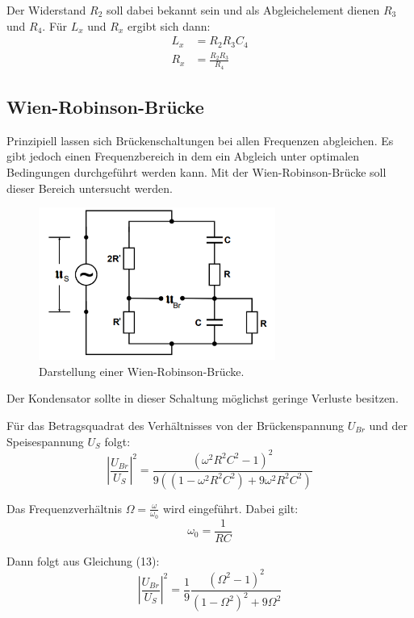 Der Widerstand $R_2$ soll dabei bekannt sein und als Abgleichelement dienen $R_3$ und $R_4$.
Für $L_x$ und $R_x$ ergibt sich dann:
\begin{align}
  L_x &= R_2 R_3 C_4 \\
  R_x &= \frac{R_2 R_3}{R_4}
\end{align}


\subsection{Wien-Robinson-Brücke}
Prinzipiell lassen sich Brückenschaltungen bei allen Frequenzen abgleichen. Es gibt jedoch einen
Frequenzbereich in dem ein Abgleich unter optimalen Bedingungen durchgeführt werden kann. Mit der
Wien-Robinson-Brücke soll dieser Bereich untersucht werden.

\begin{figure}[H]
  \centering
  \includegraphics[height=5cm]{wien.PNG}
  \caption{Darstellung einer Wien-Robinson-Brücke. \cite{sample}}
  \label{fig:wien}
\end{figure}
Der Kondensator sollte in dieser Schaltung möglichst geringe Verluste besitzen.

Für das Betragsquadrat des Verhältnisses von der Brückenspannung $U_{Br}$ und der Speisespannung $U_S$ folgt:
\begin{equation}
  \left|\frac{U_{Br}}{U_S} \right|^2 = \frac{(\omega^2 R^2 C^2 -1)^2}{9((1- \omega^2 R^2 C^2) + 9 \omega^2 R^2 C^2)}
\end{equation}

Das Frequenzverhältnis $\Omega = \frac{\omega}{\omega_0}$ wird eingeführt. Dabei gilt:
\begin{equation}
  \omega_0 = \frac{1}{RC}
\end{equation}

Dann folgt aus Gleichung (13):
\begin{equation}
  \left|\frac{U_{Br}}{U_S} \right|^2 = \frac{1}{9} \frac{(\Omega^2 -1)^2}{(1- \Omega^2)^2 + 9 \Omega^2}
\end{equation}

